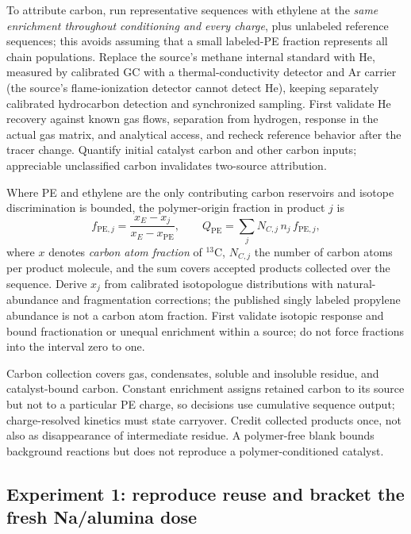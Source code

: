 To attribute carbon, run representative sequences with ethylene at the \emph{same enrichment throughout conditioning and every charge}, plus unlabeled reference sequences; this avoids assuming that a small labeled-PE fraction represents all chain populations. Replace the source's methane internal standard with He, measured by calibrated GC with a thermal-conductivity detector and Ar carrier (the source's flame-ionization detector cannot detect He), keeping separately calibrated hydrocarbon detection and synchronized sampling. First validate He recovery against known gas flows, separation from hydrogen, response in the actual gas matrix, and analytical access, and recheck reference behavior after the tracer change. Quantify initial catalyst carbon and other carbon inputs; appreciable unclassified carbon invalidates two-source attribution.

Where PE and ethylene are the only contributing carbon reservoirs and isotope discrimination is bounded, the polymer-origin fraction in product $j$ is
\begin{equation}
 f_{\mathrm{PE},j}=\frac{x_E-x_j}{x_E-x_{\mathrm{PE}}},\qquad
 Q_{\mathrm{PE}}=\sum_j N_{C,j}\,n_j\,f_{\mathrm{PE},j},
 \label{eq:polymer-isotope}
\end{equation}
where $x$ denotes \emph{carbon atom fraction} of $^{13}$C, $N_{C,j}$ the number of carbon atoms per product molecule, and the sum covers accepted products collected over the sequence. Derive $x_j$ from calibrated isotopologue distributions with natural-abundance and fragmentation corrections; the published singly labeled propylene abundance is not a carbon atom fraction. First validate isotopic response and bound fractionation or unequal enrichment within a source; do not force fractions into the interval zero to one.

Carbon collection covers gas, condensates, soluble and insoluble residue, and catalyst-bound carbon. Constant enrichment assigns retained carbon to its source but not to a particular PE charge, so decisions use cumulative sequence output; charge-resolved kinetics must state carryover. Credit collected products once, not also as disappearance of intermediate residue. A polymer-free blank bounds background reactions but does not reproduce a polymer-conditioned catalyst.

\subsection{Experiment 1: reproduce reuse and bracket the fresh Na/alumina dose}

